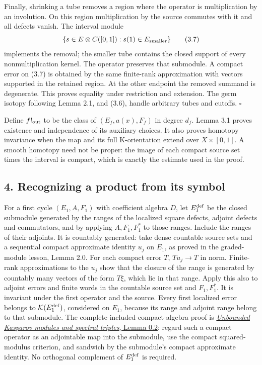 \documentclass[
  11pt,
]{article}
\begin{document}
Finally, shrinking a tube removes a region where the operator is
multiplication by an involution. On this region multiplication by the
source commutes with it and all defects vanish. The interval module \[
 \{s\in E\otimes C([0,1]):s(1)\in E_{\rm smaller}\}
 \tag{3.7}
\] implements the removal; the smaller tube contains the closed support
of every nonmultiplication kernel. The operator preserves that
submodule. A compact error on (3.7) is obtained by the same finite-rank
approximation with vectors supported in the retained region. At the
other endpoint the removed summand is degenerate. This proves equality
under restriction and extension. The germ isotopy following Lemma 2.1,
and (3.6), handle arbitrary tubes and cutoffs. \(\square\)

Define \(f!_{\rm out}\) to be the class of \((E_f,a(x),F_f)\) in degree
\(d_f\). Lemma 3.1 proves existence and independence of its auxiliary
choices. It also proves homotopy invariance when the map and its full
K-orientation extend over \(X\times[0,1]\). A smooth homotopy need not
be proper: the image of each compact source set times the interval is
compact, which is exactly the estimate used in the proof.

\subsection{4. Recognizing a product from its
symbol}\label{recognizing-a-product-from-its-symbol}

For a first cycle \((E_1,A,F_1)\) with coefficient algebra \(D\), let
\(E_1^{\rm def}\) be the closed submodule generated by the ranges of the
localized square defects, adjoint defects and commutators, and by
applying \(A,F_1,F_1^*\) to those ranges. Include the ranges of their
adjoints. It is countably generated: take dense countable source sets
and a sequential compact approximate identity \(u_j\) on \(E_1\), as
proved in the graded-module lesson, Lemma 2.0. For each compact error
\(T\), \(Tu_j\to T\) in norm. Finite-rank approximations to the \(u_j\)
show that the closure of the range is generated by countably many
vectors of the form \(T\xi\), which lie in that range. Apply this also
to adjoint errors and finite words in the countable source set and
\(F_1,F_1^*\). It is invariant under the first operator and the source.
Every first localized error belongs to \(\mathcal K(E_1^{\rm def})\),
considered on \(E_1\), because its range and adjoint range belong to
that submodule. The complete included-compact-algebra proof is
\href{KT-KK-11.html\#0-regular-calculus-localization-and-compact-supports}{\emph{Unbounded
Kasparov modules and spectral triples}, Lemma 0.2}: regard such a
compact operator as an adjointable map into the submodule, use the
compact squared-modulus criterion, and sandwich by the submodule's
compact approximate identity. No orthogonal complement of
\(E_1^{\rm def}\) is required.
\end{document}
